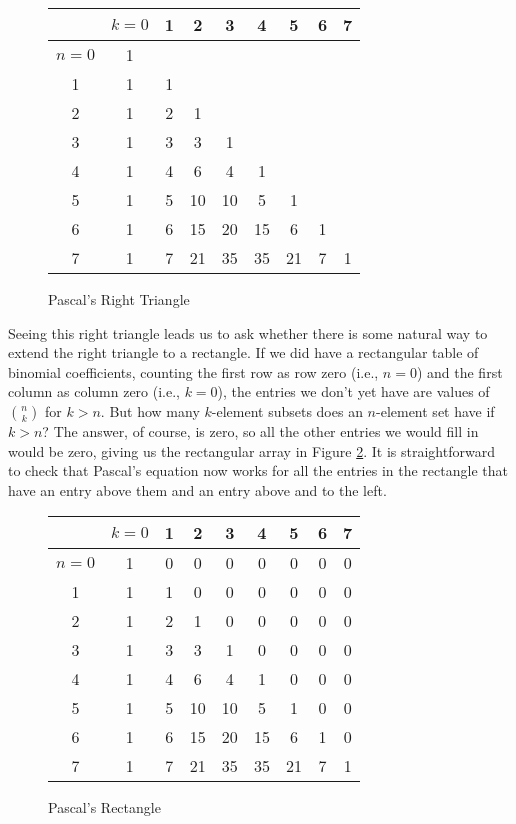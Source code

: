 \begin{figure}[ht]\caption{Pascal's Right
Triangle}\label{Pascalrighttriangle}
\begin{center}
  \begin{tabular}{c|cccccccc}
    &$k=0$ & 1 & 2 & 3 & 4 & 5 & 6 & 7\\\hline
    $n=0$  &1&&&&&&\\
    1& 1&1&&&&&\\
    2& 1&2&1&&&&&\\
    3&1&3&3&1&&&&\\
    4& 1&4&6&4&1&&&\\
    5& 1&5&10&10&5&1&&\\
    6&1&6&15&20&15&6&1&\\
    7& 1&7&21&35&35&21&7&1
  \end{tabular}
\end{center}
\end{figure}

Seeing this right triangle leads us to ask whether there is
some natural way to extend the right triangle to a rectangle. 
If we did have a rectangular table of binomial coefficients, counting
the first row as row zero (i.e., $n=0$) and the first column as column
zero (i.e., $k=0$), the entries we don't yet have are values of
$n\choose k$ for $k>n$.  But how many $k$-element subsets does
an
$n$-element set have if $k>n$?  The answer, of course, is
zero, so all the other entries we would fill in would be zero,
giving us the rectangular array in Figure \ref{Pascal'sRectangle}.   
It is straightforward to check that Pascal's equation now works for all
the entries in the rectangle that have an entry above them and an
entry above and to the left.

\begin{figure}[ht]\caption{Pascal's
Rectangle}\label{Pascal'sRectangle}
\begin{center}
  \begin{tabular}{c|cccccccc}
    &$k=0$ & 1 & 2 & 3 & 4 & 5 & 6 & 7\\\hline
    $n=0$  &1&0&0&0&0&0&0&0\\
    1& 1&1&0&0&0&0&0&0\\
    2& 1&2&1&0&0&0&0&0\\
    3&1&3&3&1&0&0&0&0\\
    4& 1&4&6&4&1&0&0&0\\
    5& 1&5&10&10&5&1&0&0\\
    6&1&6&15&20&15&6&1&0\\
    7& 1&7&21&35&35&21&7&1
  \end{tabular}
\end{center}
\end{figure}

